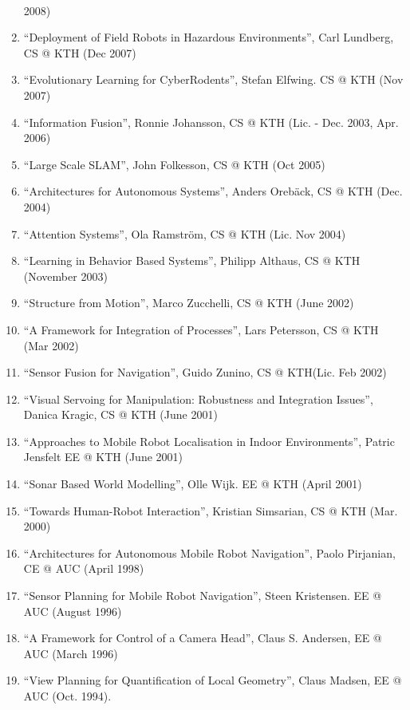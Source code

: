 \documentclass{article}
\begin{document}
\begin{cv}
\begin{cvlist}{~}
\begin{enumerate}
    2008)
  \item ``Deployment of Field Robots in Hazardous Environments'', Carl
    Lundberg, CS @ KTH (Dec 2007)
  \item ``Evolutionary Learning for CyberRodents'', Stefan Elfwing.
    CS @ KTH (Nov 2007)
  \item ``Information Fusion'', Ronnie Johansson, CS @ KTH (Lic. -
    Dec. 2003, Apr. 2006)
  \item ``Large Scale SLAM'', John Folkesson, CS @ KTH (Oct 2005)
  \item ``Architectures for Autonomous Systems'', Anders Oreb{\"a}ck,
    CS @ KTH (Dec. 2004)
  \item ``Attention Systems'', Ola Ramstr\"om, CS @ KTH (Lic. Nov 2004)
  \item ``Learning in Behavior Based Systems'', Philipp Althaus, CS @
    KTH (November 2003)
  \item ``Structure from Motion'', Marco Zucchelli, CS @ KTH (June 2002)
  \item ``A Framework for Integration of Processes'', Lars Petersson,
    CS @ KTH (Mar 2002)
  \item ``Sensor Fusion for Navigation'', Guido Zunino, CS @
    KTH(Lic. Feb 2002)
  \item ``Visual Servoing for Manipulation: Robustness and Integration
    Issues'', Danica Kragic, CS @ KTH (June 2001)
  \item ``Approaches to Mobile Robot Localisation in Indoor
    Environments'', Patric Jensfelt EE @ KTH (June 2001)
  \item ``Sonar Based World Modelling'', Olle Wijk.  EE @ KTH (April 2001)
  \item ``Towards Human-Robot Interaction'', Kristian Simsarian, CS @
    KTH (Mar. 2000)
  \item ``Architectures for Autonomous Mobile Robot Navigation'',
    Paolo Pirjanian, CE @ AUC (April 1998)
  \item ``Sensor Planning for Mobile Robot Navigation'', Steen
    Kristensen.  EE @ AUC (August 1996)
  \item ``A Framework for Control of a Camera Head'', Claus
    S. Andersen, EE @ AUC (March 1996)
  \item ``View Planning for Quantification of Local Geometry'', Claus
    Madsen, EE @ AUC (Oct. 1994).
\end{enumerate}


\end{cvlist}
\end{cv}
\end{document}

